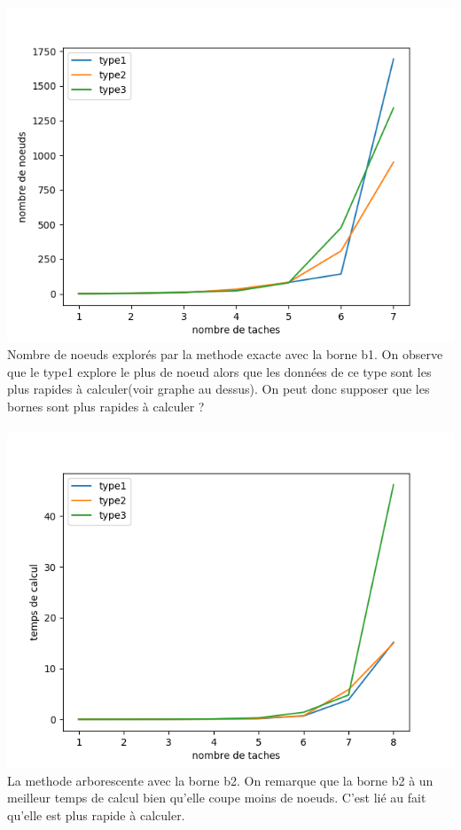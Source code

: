 \documentclass[a4paper, 10pt]{article}
\begin{document}
                \paragraph{}{
                  \includegraphics{graphes/node_b1.png}
                  Nombre de noeuds explorés par la methode exacte avec la borne b1. On observe que le type1 explore le plus de noeud alors que les données de ce type sont les plus rapides à calculer(voir graphe au dessus).
                  On peut donc supposer que les bornes sont plus rapides à calculer ?
                }

                \paragraph{}{
                  \includegraphics{graphes/exact_b2.png}
                  La methode arborescente avec la borne b2. On remarque que la borne b2 à un meilleur temps de calcul bien qu'elle coupe moins de noeuds. C'est lié au fait qu'elle est plus rapide à calculer.
                }
\end{document}
